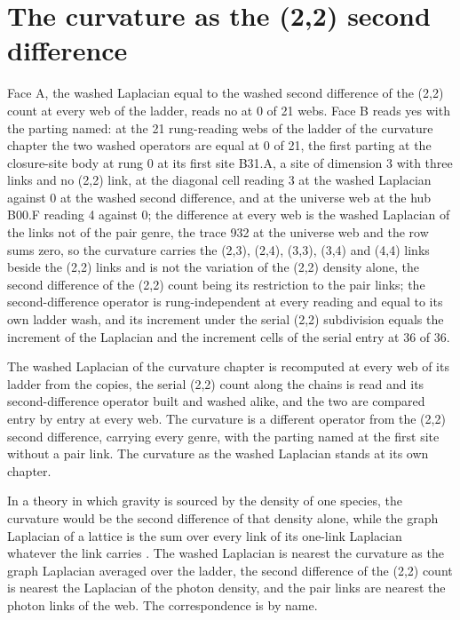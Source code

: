 \section{The curvature as the (2,2) second difference}\label{mod:X-0-D542214-w-cvsd}
\begin{chwall}
Face A, the washed Laplacian equal to the washed second difference of the (2,2) count at every web of the ladder, reads no at 0 of 21 webs. Face B reads yes with the parting named: at the 21 rung-reading webs of the ladder of the curvature chapter the two washed operators are equal at 0 of 21, the first parting at the closure-site body at rung 0 at its first site B31.A, a site of dimension 3 with three links and no (2,2) link, at the diagonal cell reading 3 at the washed Laplacian against 0 at the washed second difference, and at the universe web at the hub B00.F reading 4 against 0; the difference at every web is the washed Laplacian of the links not of the pair genre, the trace 932 at the universe web and the row sums zero, so the curvature carries the (2,3), (2,4), (3,3), (3,4) and (4,4) links beside the (2,2) links and is not the variation of the (2,2) density alone, the second difference of the (2,2) count being its restriction to the pair links; the second-difference operator is rung-independent at every reading and equal to its own ladder wash, and its increment under the serial (2,2) subdivision equals the increment of the Laplacian and the increment cells of the serial entry at 36 of 36.
\end{chwall}
\chdeps{}{}
The washed Laplacian of the curvature chapter is recomputed at every web of its ladder from the copies, the serial (2,2) count along the chains is read and its second-difference operator built and washed alike, and the two are compared entry by entry at every web. The curvature is a different operator from the (2,2) second difference, carrying every genre, with the parting named at the first site without a pair link. The curvature as the washed Laplacian stands at its own chapter.
\begin{chbridge}
In a theory in which gravity is sourced by the density of one species, the curvature would be the second difference of that density alone, while the graph Laplacian of a lattice is the sum over every link of its one-link Laplacian whatever the link carries \cite{Einstein1916,Chung1997}. The washed Laplacian is nearest the curvature as the graph Laplacian averaged over the ladder, the second difference of the (2,2) count is nearest the Laplacian of the photon density, and the pair links are nearest the photon links of the web. The correspondence is by name.
\end{chbridge}
